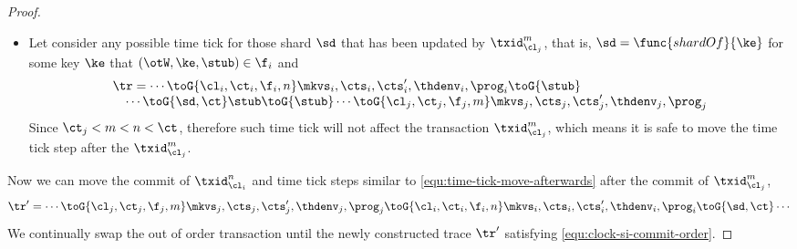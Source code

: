 \begin{proof}
\begin{itemize}
    \item Let consider any possible time tick for those shard \( \sd \) that has been updated by \( \txid_{\cl_j}^m \),
    that is, \( \sd = \func{shardOf}{\ke}\) for some key \( \ke \)  that \( (\otW, \ke, \stub) \in \f_i \) and
    \begin{equation}
    \label{equ:time-tick-move-afterwards}
    \begin{array}{@{}l@{}}
        \tr = \cdots \toG{\cl_i,\ct_i,\f_i,n} \mkvs_i, \cts_i, \cts'_i, \thdenv_i, \prog_i \toG{\stub} \\
        \quad \cdots \toG{\sd,\ct} \stub \toG{\stub} \cdots \toG{\cl_j,\ct_j,\f_j,m} \mkvs_j, \cts_j, \cts'_j, \thdenv_j, \prog_j \\
    \end{array}
    \end{equation}
    Since \( \ct_j < m < n < \ct \), therefore such time tick will not affect the transaction \( \txid_{\cl_j}^m \),
    which means it is safe to move the time tick step after the \( \txid_{\cl_j}^m \).
    \end{itemize}
    Now we can move the commit of \( \txid_{\cl_i}^n \) and time tick steps similar to \cref{equ:time-tick-move-afterwards} after the commit of \( \txid_{\cl_j}^m \),
    \[
    \begin{array}{@{}l@{}}
        \tr' = \cdots \toG{\cl_j,\ct_j,\f_j,m} \mkvs_j, \cts_j, \cts'_j, \thdenv_j, \prog_j \toG{\cl_i,\ct_i,\f_i,n} \mkvs_i, \cts_i, \cts'_i, \thdenv_i, \prog_i \toG{\sd,\ct} \cdots \\
    \end{array}
    \]
    We continually swap the out of order transaction until the newly constructed trace \( \tr' \)  satisfying \cref{equ:clock-si-commit-order}.


\end{proof}
